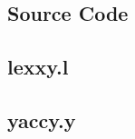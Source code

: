 \documentclass[]{article}
\begin{document}

\newpage
\begin{center}
	\section*{Source Code}
\end{center}

\subsection*{lexxy.l}
\pagebreak{}
\subsection*{yaccy.y}
\pagebreak{}


\setlength{}
\printbibliography[title={References}]

\end{document}
